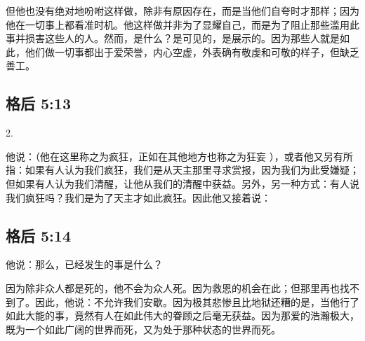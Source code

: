 但他也没有绝对地吩咐这样做，除非有原因存在，而是当他们自夸时才那样；因为他在一切事上都看准时机。他这样做并非为了显耀自己，而是为了阻止那些滥用此事并损害这些人的人。然而，是什么？是可见的，是展示的。因为那些人就是如此，他们做一切事都出于爱荣誉，内心空虚，外表确有敬虔和可敬的样子，但缺乏善工。\par


\subsection{格后 5:13}

2. \par

他说：（他在这里称之为疯狂，正如在其他地方也称之为狂妄 ），或者他又另有所指：如果有人认为我们疯狂，我们是从天主那里寻求赏报，因为我们为此受嫌疑；但如果有人认为我们清醒，让他从我们的清醒中获益。另外，另一种方式：有人说我们疯狂吗？我们是为了天主才如此疯狂。因此他又接着说：\par


\subsection{格后 5:14}

\par

他说：那么，已经发生的事是什么？\par

因为除非众人都是死的，他不会为众人死。因为救恩的机会在此；但那里再也找不到了。因此，他说：不允许我们安歇。因为极其悲惨且比地狱还糟的是，当他行了如此大能的事，竟然有人在如此伟大的眷顾之后毫无获益。因为那爱的浩瀚极大，既为一个如此广阔的世界而死，又为处于那种状态的世界而死。\par


